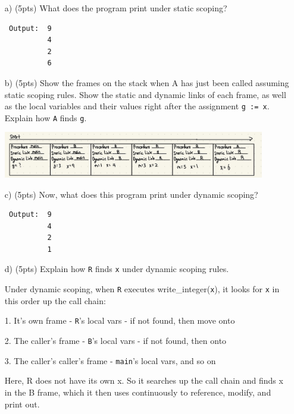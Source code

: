 \documentclass[11pt]{amsart}
\begin{document}
\begin{itemize}

\item[a)] (5pts) What does the program print under static scoping? 

\begin{verbatim}
 Output:  9
          4
          2
          6
\end{verbatim}

\newpage

\item[b)] (5pts) Show the frames on the stack when A has just been called assuming static scoping rules. Show the static and dynamic links of each frame, as well as the local variables and their values right after the assignment \texttt{g := x}. Explain how \texttt{A} finds \texttt{g}.

\vspace{0.2in}

\begin{center}
     \includegraphics[width=0.9\textwidth]{IMG_0084.jpg}
\end{center}

\vspace{0.2in}


\item[c)] (5pts) Now, what does this program print under dynamic scoping?

\begin{verbatim}
 Output:  9
          4
          2
          1
\end{verbatim}

\item[d)] (5pts) Explain how \texttt{R} finds \texttt{x} under dynamic scoping rules.

\vspace{0.1in}

Under dynamic scoping, when \texttt{R} executes write\_integer(\texttt{x}), it looks for \texttt{x} in this order up the call chain:

\vspace{0.1in}

1. It's own frame - \texttt{R}'s local vars - if not found, then move onto

2. The caller's frame - \texttt{B}'s local vars - if not found, then onto

3. The caller's caller's frame - \texttt{main}'s local vars, and so on

\vspace{0.1in}

Here, R does not have its own x.
So it searches up the call chain and finds x in the B frame,
which it then uses continuously to reference, modify, and print out.

\end{itemize}
\end{document}
